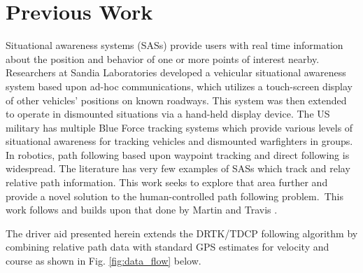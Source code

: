 \documentclass[twocolumn,10pt]{article}
\begin{document}

\section*{Previous Work}

  Situational awareness systems (SASs) provide users with real time information about the position and behavior of one or more points of interest nearby.
  Researchers at Sandia Laboratories \cite{riblett2007} developed a vehicular situational awareness system based upon ad-hoc communications, which utilizes a touch-screen display of other vehicles' positions on known roadways. This system was then extended to operate in dismounted situations via a hand-held display device.
  The US military has multiple Blue Force tracking \cite{luddy2005challenge} systems which provide various levels of situational awareness for tracking vehicles and dismounted warfighters in groups.
  In robotics, path following based upon waypoint tracking and direct following is widespread.
  The literature has very few examples of SASs which track and relay relative path information. This work seeks to explore that area further and provide a novel solution to the human-controlled path following problem.\
  This work follows and builds upon that done by Martin \cite{ScottThesis} and Travis \cite{travisdiss}.
  
  The driver aid presented herein extends the DRTK/TDCP following algorithm by combining relative path data with standard GPS estimates for velocity and course as shown in Fig. \ref{fig:data_flow} below.
\end{document}
